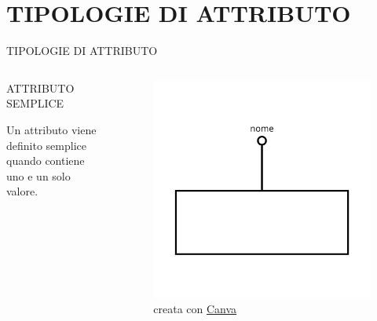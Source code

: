 \documentclass[aspectratio=1610]{beamer}
\begin{document}
\section{TIPOLOGIE DI ATTRIBUTO}

\begin{frame}{TIPOLOGIE DI ATTRIBUTO}
    \begin{columns}
            \begin{alertblock}{ATTRIBUTO SEMPLICE}
                \begin{minipage}{0.96\linewidth}
                    \justifying
                    Un attributo viene definito semplice quando contiene uno e un solo valore. \\
                    \bigskip
                \end{minipage}
            \end{alertblock}
            \begin{figure}
                \includegraphics[width=\linewidth]{img/attributo_semplice.png}
                \caption{{creata con \href{www.canva.com}{Canva}}}
            \end{figure}
    \end{columns}
\end{frame}
\end{document}

